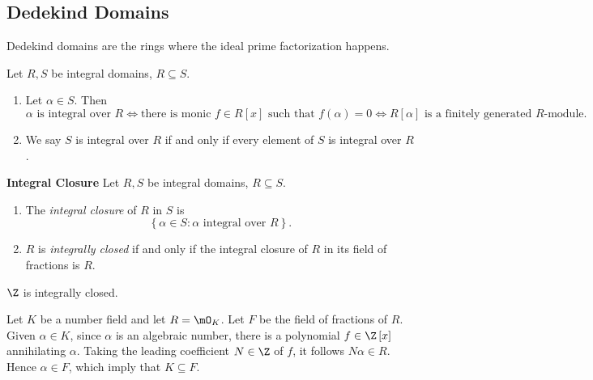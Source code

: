 \documentclass[pmath441]{subfiles}
\begin{document}
    \rruleline
    
    \subsection{Dedekind Domains}

    Dedekind domains are the rings where the ideal prime factorization happens.

    \begin{boxyrecall}{}
        Let $R,S$ be integral domains, $R\subseteq S$.
        \begin{enumerate}
            \item Let $\alpha\in S$. Then
                \begin{equation*}
                    \alpha\text{ is integral over $R$} \iff \text{there is monic $f\in R\left[ x \right]$ such that $f\left( \alpha \right)=0$} \iff \text{$R\left[ \alpha \right]$ is a finitely generated $R$-module}.
                \end{equation*}

            \item We say $S$ is integral over $R$ if and only if every element of $S$ is integral over $R$.
        \end{enumerate}
    \end{boxyrecall}
    
    \begin{definition}{\textbf{Integral Closure}}
        Let $R,S$ be integral domains, $R\subseteq S$.
        \begin{enumerate}
            \item The \emph{integral closure} of $R$ in $S$ is
                \begin{equation*}
                    \left\lbrace \alpha\in S: \alpha\text{ integral over $R$} \right\rbrace.
                \end{equation*}
            \item $R$ is \emph{integrally closed} if and only if the integral closure of $R$ in its field of fractions is $R$.
        \end{enumerate}
    \end{definition}

    \begin{example}{}
        $\Z$ is integrally closed.
    \end{example}

    \rruleline

    \np Let $K$ be a number field and let $R=\mO_K$. Let $F$ be the field of fractions of $R$. Given $\alpha\in K$, since $\alpha$ is an algebraic number, there is a polynomial $f\in\Z\left[ x \right]$ annihilating $\alpha$. Taking the leading coefficient $N\in\Z$ of $f$, it follows $N\alpha\in R$. Hence $\alpha\in F$, which imply that $K\subseteq F$.
\end{document}
